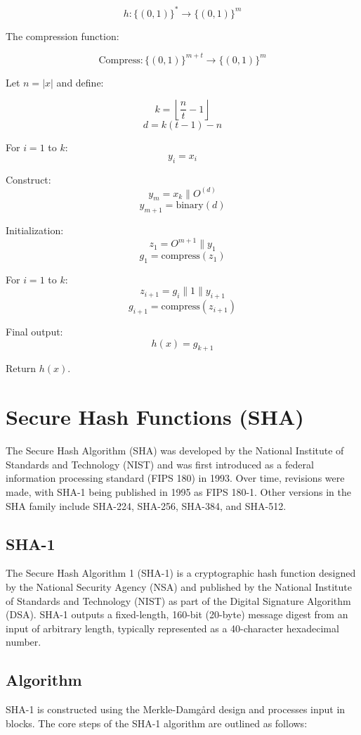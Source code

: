 \documentclass{article}
\begin{document}
\[ h : \{(0, 1)\}^* \rightarrow \{(0, 1)\}^m \]

The compression function:

\[ \text{Compress}: \{(0, 1)\}^{m+t} \rightarrow \{(0, 1)\}^m \]

Let $n = |x|$ and define:

\[ k = \left\lfloor \frac{n}{t} - 1 \right\rfloor \]
\[ d = k(t - 1) - n \]

For $i = 1$ to $k$:
\[ y_i = x_i \]

Construct:
\[ y_m = x_k \parallel O^{(d)} \]
\[ y_{m+1} = \text{binary}(d) \]

Initialization:
\[ z_1 = O^{m+1} \parallel y_1 \]
\[ g_1 = \text{compress}(z_1) \]

For $i = 1$ to $k$:
\[ z_{i+1} = g_i \parallel 1 \parallel y_{i+1} \]
\[ g_{i+1} = \text{compress}(z_{i+1}) \]

Final output:
\[ h(x) = g_{k+1} \]

Return $h(x)$.

\section{Secure Hash Functions (SHA)}

The Secure Hash Algorithm (SHA) was developed by the National Institute of Standards and Technology (NIST) and was first introduced as a federal information processing standard (FIPS 180) in 1993. Over time, revisions were made, with SHA-1 being published in 1995 as FIPS 180-1. Other versions in the SHA family include SHA-224, SHA-256, SHA-384, and SHA-512.

\subsection{SHA-1}

The Secure Hash Algorithm 1 (SHA-1) is a cryptographic hash function designed by the National Security Agency (NSA) and published by the National Institute of Standards and Technology (NIST) as part of the Digital Signature Algorithm (DSA). SHA-1 outputs a fixed-length, 160-bit (20-byte) message digest from an input of arbitrary length, typically represented as a 40-character hexadecimal number.

\subsection{Algorithm}

SHA-1 is constructed using the Merkle-Damg\r{a}rd design and processes input in blocks. The core steps of the SHA-1 algorithm are outlined as follows:
\end{document}
